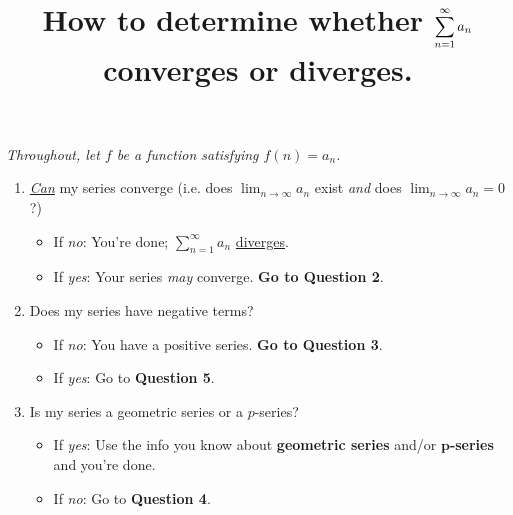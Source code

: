 \documentclass[12pt]{article}
\title{\vspace{-0.75in}\Large{How to determine whether $\displaystyle\ser$ converges or diverges.}\vspace{-0.75in}}
\date{}
\newcommand{\infsum}[3]{\sum_{{#1}={#2}}^\infty {#3}}
\newcommand{\ser}{\infsum{n}{1}{a_n}}
\begin{document}
	\maketitle
	\vspace{-0.25in}
	\begin{center}
	\textit{Throughout, let $f$ be a function satisfying $f(n)=a_n$.}
	\end{center}
	\vspace{0.0625in}
	
	\begin{enumerate}
		\item \textit{\ul{Can}} my series converge (i.e. does $\lim_{n\to\infty} a_n$ exist \textit{and} does $\lim_{n\to\infty}a_n=0$?)%
			\begin{itemize}
					\item If \textit{no}: You're done; $\ser$ \ul{diverges}.
					\item If \textit{yes}: Your series \textit{may} converge. \textbf{Go to Question 2}.
			\end{itemize}
	
		\item Does my series have negative terms?
			\begin{itemize}
				\item If \textit{no}: You have a positive series. \textbf{Go to Question 3}.
				\item If \textit{yes}: Go to \textbf{Question 5}.
			\end{itemize}
		
		\item Is my series a geometric series or a $p$-series?
			\begin{itemize}
				\item If \textit{yes}: Use the info you know about \textbf{geometric series} and/or \textbf{$\boldsymbol{p}$-series} and you're done.
				\item If \textit{no}: Go to \textbf{Question 4}.
			\end{itemize}
		

\end{enumerate}
\end{document}
